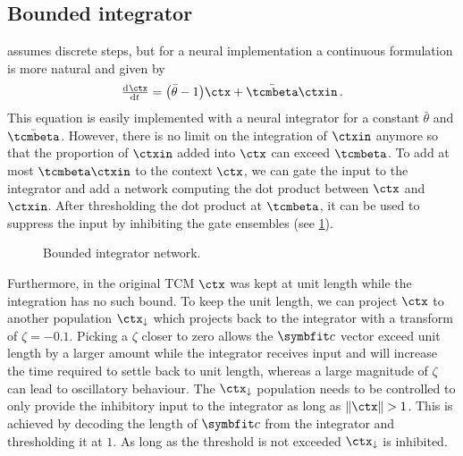 \subsection{Bounded integrator}
 assumes discrete steps, but for a neural implementation a continuous formulation is more natural and given by
\begin{equation}
    \od{\ctx}{t} = \big(\bar{\theta} - 1\big) \ctx + \bar{\tcmbeta} \ctxin\,\text{.}
\end{equation}
This equation is easily implemented with a neural integrator for a constant $\bar{\theta}$ and $\bar{\tcmbeta}$.
However, there is no limit on the integration of $\ctxin$ anymore so that the proportion of $\ctxin$ added into $\ctx$ can exceed $\tcmbeta$.
To add at most $\tcmbeta \ctxin$ to the context $\ctx$, we can gate the input to the integrator and add a network computing the dot product between $\ctx$ and $\ctxin$.
After thresholding the dot product at $\tcmbeta$, it can be used to suppress the input by inhibiting the gate ensembles (see \cref{fig:ctx-bounded-integrator}).
\begin{figure}
    \centering
    \caption{Bounded integrator network.}\label{fig:ctx-bounded-integrator}
\end{figure}
Furthermore, in the original TCM $\ctx$ was kept at unit length while the integration has no such bound.
To keep the unit length, we can project $\ctx$ to another population $\ctx_{\downarrow}$ which projects back to the integrator with a transform of $\zeta = -0.1$.
Picking a $\zeta$ closer to zero allows the $\vc c$ vector exceed unit length by a larger amount while the integrator receives input and will increase the time required to settle back to unit length, whereas a large magnitude of $\zeta$ can lead to oscillatory behaviour.
The $\ctx_{\downarrow}$ population needs to be controlled to only provide the inhibitory input to the integrator as long as $\lVert\ctx\rVert > 1$.
This is achieved by decoding the length of $\vc c$ from the integrator and thresholding it at $1$.
As long as the threshold is not exceeded $\ctx_{\downarrow}$ is inhibited.

